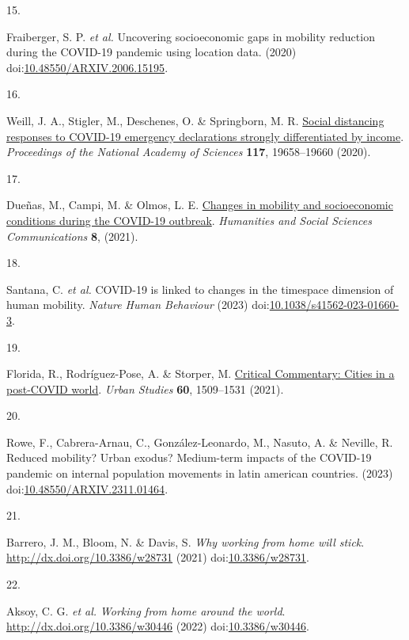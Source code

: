 \documentclass[
  11pt,
]{article}
\newlength{\cslhangindent}
\newlength{\csllabelwidth}
\newenvironment{CSLReferences}[2] %
 {\begin{list}{}{%
  \setlength{\itemindent}{0pt}
  \setlength{\leftmargin}{0pt}
  \setlength{\parsep}{0pt}
  \ifodd #1
   \setlength{\leftmargin}{\cslhangindent}
   \setlength{\itemindent}{-1\cslhangindent}
  \fi
  \setlength{\itemsep}{#2\baselineskip}}}
 {\end{list}}
\newcommand{\CSLLeftMargin}[1]{\parbox[t]{\csllabelwidth}{\strut#1\strut}}
\newcommand{\CSLRightInline}[1]{\parbox[t]{\linewidth - \csllabelwidth}{\strut#1\strut}}
\begin{document}
\begin{CSLReferences}{0}{0}
\CSLLeftMargin{15. }%
\CSLRightInline{Fraiberger, S. P. \emph{et al.} Uncovering socioeconomic
gaps in mobility reduction during the COVID-19 pandemic using location
data. (2020)
doi:\href{https://doi.org/10.48550/ARXIV.2006.15195}{10.48550/ARXIV.2006.15195}.}

\CSLLeftMargin{16. }%
\CSLRightInline{Weill, J. A., Stigler, M., Deschenes, O. \& Springborn,
M. R. \href{https://doi.org/10.1073/pnas.2009412117}{Social distancing
responses to COVID-19 emergency declarations strongly differentiated by
income}. \emph{Proceedings of the National Academy of Sciences}
\textbf{117}, 19658--19660 (2020).}

\CSLLeftMargin{17. }%
\CSLRightInline{Dueñas, M., Campi, M. \& Olmos, L. E.
\href{https://doi.org/10.1057/s41599-021-00775-0}{Changes in mobility
and socioeconomic conditions during the COVID-19 outbreak}.
\emph{Humanities and Social Sciences Communications} \textbf{8},
(2021).}

\CSLLeftMargin{18. }%
\CSLRightInline{Santana, C. \emph{et al.} COVID-19 is linked to changes
in the time{\textendash}space dimension of human mobility. \emph{Nature
Human Behaviour} (2023)
doi:\href{https://doi.org/10.1038/s41562-023-01660-3}{10.1038/s41562-023-01660-3}.}

\CSLLeftMargin{19. }%
\CSLRightInline{Florida, R., Rodríguez-Pose, A. \& Storper, M.
\href{https://doi.org/10.1177/00420980211018072}{Critical Commentary:
Cities in a post-COVID world}. \emph{Urban Studies} \textbf{60},
1509--1531 (2021).}

\CSLLeftMargin{20. }%
\CSLRightInline{Rowe, F., Cabrera-Arnau, C., González-Leonardo, M.,
Nasuto, A. \& Neville, R. Reduced mobility? Urban exodus? Medium-term
impacts of the COVID-19 pandemic on internal population movements in
latin american countries. (2023)
doi:\href{https://doi.org/10.48550/ARXIV.2311.01464}{10.48550/ARXIV.2311.01464}.}

\CSLLeftMargin{21. }%
\CSLRightInline{Barrero, J. M., Bloom, N. \& Davis, S. \emph{Why working
from home will stick}. \url{http://dx.doi.org/10.3386/w28731} (2021)
doi:\href{https://doi.org/10.3386/w28731}{10.3386/w28731}.}

\CSLLeftMargin{22. }%
\CSLRightInline{Aksoy, C. G. \emph{et al.} \emph{Working from home
around the world}. \url{http://dx.doi.org/10.3386/w30446} (2022)
doi:\href{https://doi.org/10.3386/w30446}{10.3386/w30446}.}


\end{CSLReferences}
\end{document}
